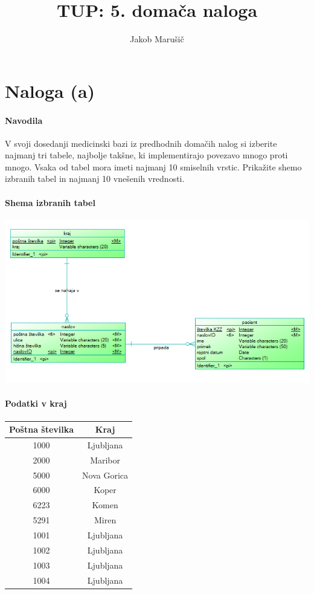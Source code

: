 \documentclass[a4paper,11pt]{report}
\begin{document}
\title{TUP: 5. domača naloga}
\author{Jakob Marušič}
\maketitle

\section*{Naloga (a)}

\paragraph{Navodila}
\begin{em}
    V svoji dosedanji medicinski bazi iz predhodnih domačih nalog si izberite najmanj tri tabele, najbolje takšne, ki implementirajo povezavo mnogo proti mnogo. Vsaka od tabel mora imeti najmanj 10 smiselnih vrstic. Prikažite shemo izbranih tabel in najmanj 10 vnešenih vrednosti.
\end{em}

\paragraph{Shema izbranih tabel}\mbox{}

\noindent\includegraphics[width=\linewidth]{./pics/konceptualni.png}

\paragraph{Podatki v kraj}\mbox{}

\begin{tabular}{||c|c||}
    \hline
    Poštna številka&Kraj\\
    \hline
    \hline
        1000&Ljubljana\\
        2000&Maribor\\
        5000&Nova Gorica\\
        6000&Koper\\
        6223&Komen\\
        5291&Miren\\
        1001&Ljubljana\\
        1002&Ljubljana\\
        1003&Ljubljana\\
        1004&Ljubljana\\
    \hline
\end{tabular}
\end{document}
